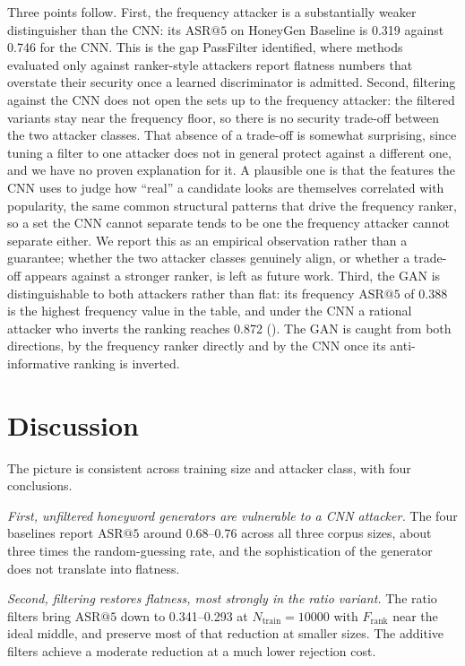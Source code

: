 Three points follow. First, the frequency attacker is a substantially
weaker distinguisher than the CNN: its $\mathrm{ASR}@5$ on HoneyGen
Baseline is 0.319 against 0.746 for the CNN. This is the gap PassFilter
identified, where methods evaluated only against ranker-style attackers
report flatness numbers that overstate their security once a learned
discriminator is admitted. Second, filtering against the CNN does not
open the sets up to the frequency attacker: the filtered variants stay
near the frequency floor, so there is no security trade-off between the
two attacker classes. That absence of a trade-off is somewhat
surprising, since tuning a filter to one attacker does not in general
protect against a different one, and we have no proven explanation for
it. A plausible one is that the features the CNN uses to judge how
``real'' a candidate looks are themselves correlated with popularity,
the same common structural patterns that drive the frequency ranker, so
a set the CNN cannot separate tends to be one the frequency attacker
cannot separate either. We report this as an empirical observation
rather than a guarantee; whether the two attacker classes genuinely
align, or whether a trade-off appears against a stronger ranker, is left
as future work. Third, the GAN is distinguishable to both attackers
rather than flat: its frequency $\mathrm{ASR}@5$ of 0.388 is the highest
frequency value in the table, and under the CNN a rational attacker who
inverts the ranking reaches 0.872 (). The GAN is
caught from both directions, by the frequency ranker directly and by the
CNN once its anti-informative ranking is inverted.

\section{Discussion}
\label{sec:results-discussion}

The picture is consistent across training size and attacker class, with
four conclusions.

\emph{First, unfiltered honeyword generators are vulnerable to a CNN
attacker.} The four baselines report $\mathrm{ASR}@5$ around
$0.68$--$0.76$ across all three corpus sizes, about three times the
random-guessing rate, and the sophistication of the generator does not
translate into flatness.

\emph{Second, filtering restores flatness, most strongly in the ratio
variant.} The ratio filters bring $\mathrm{ASR}@5$ down to
0.341--0.293 at $N_{\text{train}} = 10000$ with $F_{\text{rank}}$ near
the ideal middle, and preserve most of that reduction at smaller sizes.
The additive filters achieve a moderate reduction at a much lower
rejection cost.

